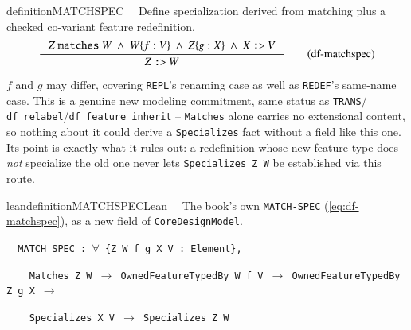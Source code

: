 \begin{restatable}{definition}{MATCHSPEC}~~ Define specialization derived from
matching plus a checked co-variant feature redefinition.
\begin{align}
\inference
{Z~\texttt{matches}~W~\wedge~W\{f:V\}~\wedge~Z\{g:X\}~\wedge~X~\texttt{:>}~V}
{Z~\texttt{:>}~W}
\label{eq:df-matchspec}\tag{df-matchspec}
\end{align}
\end{restatable}

\pn $f$ and $g$ may differ, covering \texttt{REPL}'s renaming case as well as \texttt{REDEF}'s
same-name case. This is a genuine new modeling commitment, same status as \texttt{TRANS}/
\texttt{df\_relabel}/\texttt{df\_feature\_inherit} -- \texttt{Matches} alone carries no extensional
content, so nothing about it could derive a \texttt{Specializes} fact without a field like this one.
Its point is exactly what it rules out: a redefinition whose new feature type does \emph{not}
specialize the old one never lets \texttt{Specializes Z W} be established via this route.

\begin{restatable}{leandefinition}{MATCHSPECLean}~~ The book's own
\texttt{MATCH-SPEC} (\ref{eq:df-matchspec}), as a new field of \texttt{CoreDesignModel}.

\texttt{~~MATCH\_SPEC : $\forall$ \{Z W f g X V : Element\},}

\texttt{~~~~Matches Z W $\to$ OwnedFeatureTypedBy W f V $\to$ OwnedFeatureTypedBy Z g X $\to$}

\texttt{~~~~Specializes X V $\to$ Specializes Z W}
\label{MATCH_SPEC}
\end{restatable}

